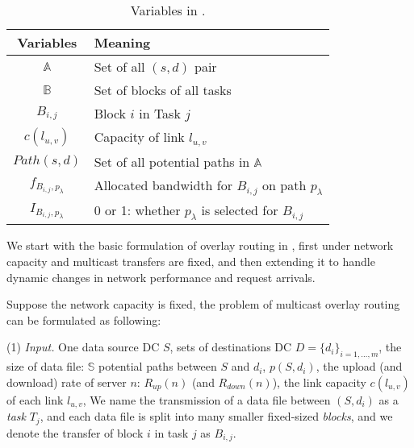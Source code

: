 \begin{table}[t]
\begin{center}
\begin{tabular}{| c | l|}
\hline
 \rowcolor[gray]{0.9}
\textbf{Variables} & \textbf{Meaning} \\
\hline \hline
\textit{$\mathbb{A}$} & Set of all $(s, d)$ pair\\
\hline
\textit{$\mathbb{B}$} & Set of blocks of all tasks\\
\hline
\textit{$B_{i,j}$} & Block $i$ in Task $j$\\
\hline
\textit{$c(l_{u,v})$} & Capacity of link $l_{u,v}$\\
\hline
\textit{$Path(s,d)$} & Set of all potential paths in $\mathbb{A}$\\
\hline
\textit{$f_{B_{i,j},p_\lambda}$} & Allocated bandwidth for $B_{i,j}$ on path $p_\lambda$\\
\hline
\textit{$I_{B_{i,j},p_\lambda}$} & 0 or 1: whether $p_\lambda$ is selected for $B_{i,j}$\\
\hline
\end{tabular}
\end{center}
\caption{Variables in \name.}
\label{table:para}
\end{table}

We start with the basic formulation of overlay routing in \name,
first under network capacity and multicast 
transfers are fixed, and then extending it to
handle dynamic changes in network performance and request arrivals.

Suppose the network capacity is fixed, the problem of multicast
overlay routing can be formulated as following:


\noindent(1) {\em Input.}
One data source DC $S$, sets of destinations DC
$D=\{d_i\}_{i=1,\dots,m}$,
the size of data file: $\mathbb{S}$
potential paths between $S$ and $d_i$, $p(S,d_i)$,
the upload (and download) rate of server $n$: $R_{up}(n)$
(and $R_{down}(n)$),
the link capacity  $c(l_{u,v})$ of each link $l_{u,v}$,
We name the transmission of a data file between $(S,d_i)$
as a {\em task} $T_j$, and each data file is split into
many smaller fixed-sized {\em blocks}, and we denote
the transfer of block $i$ in task $j$ as $B_{i,j}$.

